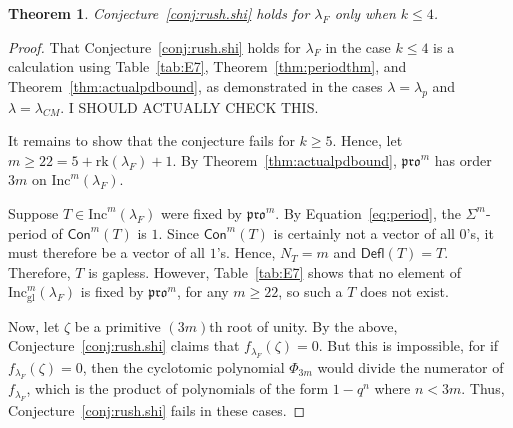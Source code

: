 \documentclass[12pt]{amsart}
\newtheorem{theorem}{Theorem}[section]
\theoremstyle{definition}
\theoremstyle{remark}
\numberwithin{equation}{section}
\newcommand{\inc}{\ensuremath{\mathrm{Inc}}}
\newcommand{\incgl}{\inc_{\mathrm{gl}}}
\newcommand{\pro}{\mathfrak{pro}}
\newcommand{\rank}{\ensuremath{\mathrm{rk}}}
\newcommand{\deflate}{\ensuremath{\mathsf{Defl}}}
\newcommand{\content}{\ensuremath{\mathsf{Con}}}
\begin{document}
\begin{theorem}\label{thm:F_bad}
Conjecture~\ref{conj:rush.shi} holds for $\lambda_F$ only when $k \leq 4$.
\end{theorem}
\begin{proof}
That Conjecture~\ref{conj:rush.shi} holds for $\lambda_F$ in the case $k \leq 4$ is a calculation using Table~\ref{tab:E7}, Theorem~\ref{thm:periodthm}, and Theorem~\ref{thm:actualpdbound}, as demonstrated in the cases $\lambda = \lambda_p$ and $\lambda = \lambda_{CM}$.  I SHOULD ACTUALLY CHECK THIS.

It remains to show that the conjecture fails for $k \geq 5$. Hence, let $m \geq 22 = 5 +  \rank(\lambda_F) + 1$. By Theorem~\ref{thm:actualpdbound}, $\pro^m$ has order $3m$ on $\inc^m(\lambda_F)$. 

Suppose $T \in \inc^m(\lambda_F)$ were fixed by $\pro^m$.  By Equation~\ref{eq:period}, the $\Sigma^m$-period of $\content^m(T)$ is $1$. Since $\content^m(T)$ is certainly not a vector of all $0$'s, it must therefore be a vector of all $1$'s. Hence, $N_T = m$ and $\deflate(T) = T$. Therefore, $T$ is gapless. However, Table~\ref{tab:E7} shows that no element of $\incgl^m(\lambda_F)$ is fixed by $\pro^m$, for any $m \geq 22$, so such a $T$ does not exist.


Now, let $\zeta$ be a primitive $(3m)$th root of unity. By the above, Conjecture~\ref{conj:rush.shi} claims that $f_{\lambda_F}(\zeta) = 0$. But this is impossible, for if $f_{\lambda_F}(\zeta) = 0$, then the cyclotomic polynomial $\Phi_{3m}$ would divide the numerator of $f_{\lambda_F}$, which is the product of polynomials of the form $1-q^n$ where $n < 3m$. Thus, Conjecture~\ref{conj:rush.shi} fails in these cases. 
\end{proof}
%
\end{document}
